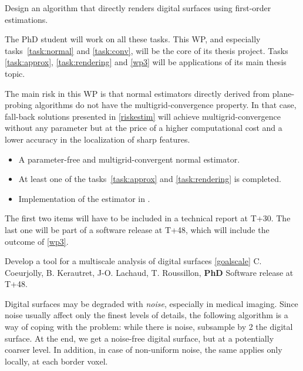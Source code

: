 \begin{Task}
  \label{task:rendering}
  Design an algorithm that directly renders digital surfaces using first-order estimations.  
\end{Task}

The PhD student will work on all these tasks. This WP, and especially tasks~\ref{task:normal}
and \ref{task:conv}, will be the core of its thesis project. Tasks \ref{task:approx},
\ref{task:rendering} and \ref{wp3} will be applications of its main thesis topic.  

\Risks
The main risk in this WP is that normal estimators
directly derived from plane-probing algorithms do not have the multigrid-convergence
property. In that case, fall-back solutions presented in \ref{riskestim} will achieve
multigrid-convergence without any parameter but at the price of a higher computational
cost and a lower accuracy in the localization of sharp features. 

\Success
\begin{itemize}
  \item A parameter-free and multigrid-convergent normal estimator.
  \item At least one of the tasks~\ref{task:approx} and \ref{task:rendering} is completed. 
  \item Implementation of the estimator in \DGtal.
\end{itemize}

The first two items will have to be included in a technical report at T+30.
The last one will be part of a software release at T+48, which will include
the outcome of \ref{wp3}. 

  

\medskip
{}
   {Develop a tool for a multiscale analysis of digital surfaces \ref{goalscale}}
   {C. Coeurjolly, B. Kerautret, J-O. Lachaud, T. Roussillon, \textbf{PhD}}
   {Software release at T+48.}
\medskip

Digital surfaces may be degraded with \emph{noise}, especially in medical imaging.
Since noise usually affect only the finest levels of details, the following algorithm
is a way of coping with the problem: while there is noise, subsample by 2 the digital surface.
At the end, we get a noise-free digital surface, but at a potentially coarser level.
In addition, in case of non-uniform noise, the same applies only locally, \ie at each border voxel.  

